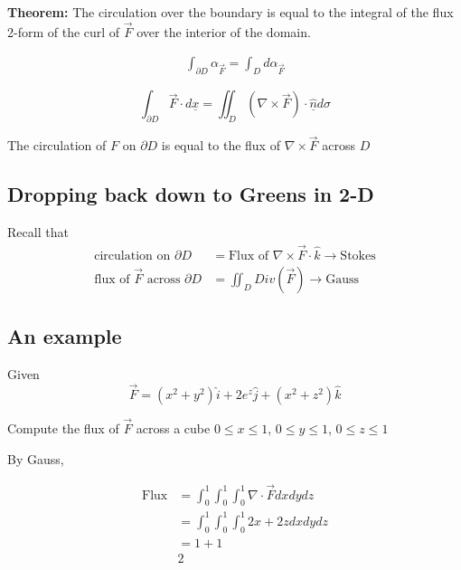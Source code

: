 \begin{framed}
   \textbf{Theorem:} The circulation over the boundary is equal to the integral of the flux 2-form of the curl of $\vec{F}$ over the interior of the domain.

   \begin{align*}
      \int_{\partial D}^{} \alpha_{\vec{F}} = \int_{D}^{} d \alpha_{\vec{F}}   
   \end{align*}

   \[
     \int_{\partial D}^{} \vec{F} \cdot d \underline{x}  = \iint_D \left( \nabla \times \vec{F} \right) \cdot \hat{ \underline{n}} d\sigma
   \] 

   The circulation of $F$ on $\partial D$ is equal to the flux of $\nabla \times \vec{F}$ across $D$

\end{framed}

\subsection{Dropping back down to Greens in 2-D}

Recall that 
\begin{align*}
   \text{circulation on $\partial D$} &= \text{Flux of $\nabla \times \vec{F} \cdot \hat{k}$} \rightarrow \text{Stokes} \\
   \text{flux of $\vec{F}$ across $\partial D$} &= \iint_D Div(\vec{F}) \rightarrow \text{Gauss}
\end{align*}


\subsection{An example}

Given
\[
  \vec{F} = \left( x^2 + y^2 \right) \hat{i} + 2e^z \hat{j} + (x^2 + z^2) \hat{k}
\] 

Compute the flux of $\vec{F}$ across a cube $0 \leq x \leq 1$, $0 \leq y \leq 1$,  $0 \leq z \leq 1$

By Gauss,

\begin{align*}
   \text{Flux} &= \int_{0}^{1} \int_{0}^{1} \int_{0}^{1}  \nabla \cdot \vec{F} dx dy dz \\
               &= \int_{0}^{1} \int_{0}^{1}    \int_{0}^{1}  2x + 2z dx dy dz \\
               &= 1 + 1  \\
               & 2
\end{align*}


